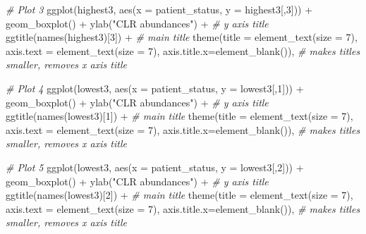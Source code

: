 \documentclass[
  oneside]{book}
\newenvironment{Shaded}{\begin{snugshade}}{\end{snugshade}}
\newcommand{\AttributeTok}[1]{\textcolor[rgb]{0.77,0.63,0.00}{#1}}
\newcommand{\CommentTok}[1]{\textcolor[rgb]{0.56,0.35,0.01}{\textit{#1}}}
\newcommand{\DecValTok}[1]{\textcolor[rgb]{0.00,0.00,0.81}{#1}}
\newcommand{\FunctionTok}[1]{\textcolor[rgb]{0.00,0.00,0.00}{#1}}
\newcommand{\NormalTok}[1]{#1}
\newcommand{\SpecialCharTok}[1]{\textcolor[rgb]{0.00,0.00,0.00}{#1}}
\newcommand{\StringTok}[1]{\textcolor[rgb]{0.31,0.60,0.02}{#1}}
\begin{document}
\begin{Shaded}
\begin{Highlighting}[]
  \CommentTok{\# Plot 3}
  \FunctionTok{ggplot}\NormalTok{(highest3, }\FunctionTok{aes}\NormalTok{(}\AttributeTok{x =}\NormalTok{ patient\_status, }\AttributeTok{y =}\NormalTok{ highest3[,}\DecValTok{3}\NormalTok{])) }\SpecialCharTok{+} 
    \FunctionTok{geom\_boxplot}\NormalTok{() }\SpecialCharTok{+} 
    \FunctionTok{ylab}\NormalTok{(}\StringTok{"CLR abundances"}\NormalTok{) }\SpecialCharTok{+} \CommentTok{\# y axis title}
    \FunctionTok{ggtitle}\NormalTok{(}\FunctionTok{names}\NormalTok{(highest3)[}\DecValTok{3}\NormalTok{]) }\SpecialCharTok{+} \CommentTok{\# main title}
    \FunctionTok{theme}\NormalTok{(}\AttributeTok{title =} \FunctionTok{element\_text}\NormalTok{(}\AttributeTok{size =} \DecValTok{7}\NormalTok{),}
          \AttributeTok{axis.text =} \FunctionTok{element\_text}\NormalTok{(}\AttributeTok{size =} \DecValTok{7}\NormalTok{),}
          \AttributeTok{axis.title.x=}\FunctionTok{element\_blank}\NormalTok{()), }\CommentTok{\# makes titles smaller, removes x axis title}
  
  \CommentTok{\# Plot 4}
  \FunctionTok{ggplot}\NormalTok{(lowest3, }\FunctionTok{aes}\NormalTok{(}\AttributeTok{x =}\NormalTok{ patient\_status, }\AttributeTok{y =}\NormalTok{ lowest3[,}\DecValTok{1}\NormalTok{])) }\SpecialCharTok{+} 
    \FunctionTok{geom\_boxplot}\NormalTok{() }\SpecialCharTok{+} 
    \FunctionTok{ylab}\NormalTok{(}\StringTok{"CLR abundances"}\NormalTok{) }\SpecialCharTok{+} \CommentTok{\# y axis title}
    \FunctionTok{ggtitle}\NormalTok{(}\FunctionTok{names}\NormalTok{(lowest3)[}\DecValTok{1}\NormalTok{]) }\SpecialCharTok{+} \CommentTok{\# main title}
    \FunctionTok{theme}\NormalTok{(}\AttributeTok{title =} \FunctionTok{element\_text}\NormalTok{(}\AttributeTok{size =} \DecValTok{7}\NormalTok{),}
          \AttributeTok{axis.text =} \FunctionTok{element\_text}\NormalTok{(}\AttributeTok{size =} \DecValTok{7}\NormalTok{),}
          \AttributeTok{axis.title.x=}\FunctionTok{element\_blank}\NormalTok{()), }\CommentTok{\# makes titles smaller, removes x axis title}
  
  \CommentTok{\# Plot 5}
  \FunctionTok{ggplot}\NormalTok{(lowest3, }\FunctionTok{aes}\NormalTok{(}\AttributeTok{x =}\NormalTok{ patient\_status, }\AttributeTok{y =}\NormalTok{ lowest3[,}\DecValTok{2}\NormalTok{])) }\SpecialCharTok{+} 
    \FunctionTok{geom\_boxplot}\NormalTok{() }\SpecialCharTok{+} 
    \FunctionTok{ylab}\NormalTok{(}\StringTok{"CLR abundances"}\NormalTok{) }\SpecialCharTok{+} \CommentTok{\# y axis title}
    \FunctionTok{ggtitle}\NormalTok{(}\FunctionTok{names}\NormalTok{(lowest3)[}\DecValTok{2}\NormalTok{]) }\SpecialCharTok{+} \CommentTok{\# main title}
    \FunctionTok{theme}\NormalTok{(}\AttributeTok{title =} \FunctionTok{element\_text}\NormalTok{(}\AttributeTok{size =} \DecValTok{7}\NormalTok{),}
          \AttributeTok{axis.text =} \FunctionTok{element\_text}\NormalTok{(}\AttributeTok{size =} \DecValTok{7}\NormalTok{),}
          \AttributeTok{axis.title.x=}\FunctionTok{element\_blank}\NormalTok{()), }\CommentTok{\# makes titles smaller, removes x axis title}
  

\end{Highlighting}
\end{Shaded}
\end{document}
